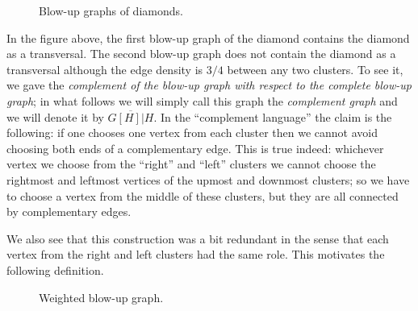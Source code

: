 \documentclass[12pt,a4paper]{amsart}
\numberwithin{equation}{section}
\begin{document}
\begin{figure}[ht]
\begin{minipage}[b]{0.25\linewidth}
\begin{center}
\end{center}
\end{minipage}
\hspace{1cm}
\begin{minipage}[b]{0.25\linewidth}
\begin{center}
\end{center}  
\end{minipage}
\hspace{1cm}
\begin{minipage}[b]{0.25\linewidth}
\begin{center}
\end{center}
\end{minipage}

\caption{Blow-up graphs of diamonds.} 

\end{figure}

\bigskip

In the  figure above, the first blow-up graph of the diamond contains the
diamond as a transversal. The second blow-up graph does not contain the
diamond as a transversal although the edge density is $3/4$ between any two
clusters. To see it, we gave the \textit{complement of the blow-up
  graph with respect to   the complete blow-up graph}; in what follows we
will simply call this graph the \textit{complement graph} and we will denote
it by $\overline{G[H]|H}$. In the ``complement language'' the claim is the 
following: if one chooses one vertex from each cluster then we cannot avoid
choosing both ends of a complementary edge. This is true indeed: whichever
vertex we  choose from the ``right'' and ``left'' clusters we cannot choose
the rightmost and leftmost vertices of the upmost and downmost clusters; so we
have to choose a vertex from the middle of these clusters, but they are all
connected by complementary edges. 

We also see that this construction was a bit redundant in the sense that each
vertex from the right and left clusters had the same role. This motivates the
following definition.   

\begin{figure}[h!]
\begin{center}
   \caption{Weighted
  blow-up graph.} 
\end{center}
\end{figure} 
    
\end{document}
